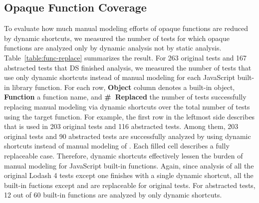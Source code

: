 \subsection{Opaque Function Coverage}
To evaluate how much manual modeling efforts of opaque functions
are reduced by dynamic shortcuts, we measured the number of tests for which
opaque functions are analyzed only by dynamic analysis not by
static analysis.  Table~\ref{table:func-replace} summarizes the result.
For 263 original tests and 167 abstracted tests that DS finished analysis, we measured the
number of tests that use only dynamic shortcuts instead of manual modeling
for each JavaScript built-in library function.  For each row,
\textbf{Object} column denotes a built-in object, \textbf{Function} a function
name, and \textbf{\#~Replaced} the number of tests successfully replacing manual
modeling via dynamic shortcuts over the total number of tests using the target function.
For example, the first row in the leftmost side describes that  is used in
203 original tests and 116 abstracted tests.  Among them, 203 original
tests and 90 abstracted tests are successfully analyzed by using dynamic shortcuts
instead of manual modeling of .  Each filled cell describes
a fully replaceable case.  Therefore, dynamic
shortcuts effectively lessen the burden of manual modeling for JavaScript
built-in functions.  Again, since analysis of all the original Lodash 4 tests except one
finishes with a single dynamic shortcut, all the built-in fuctions
except  and  are replaceable
for original tests.  For abstracted tests, 12 out of 60 built-in
functions are analyzed by only dynamic shortcuts.
